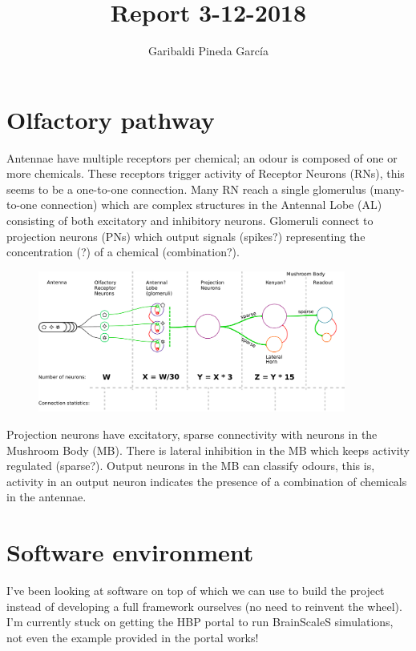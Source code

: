 \documentclass[11pt,a4paper]{article}
\author{Garibaldi Pineda Garc{\'i}a}
\title{Report 3-12-2018}
\begin{document}
\maketitle

\section{Olfactory pathway}

Antennae have multiple receptors per chemical; an odour is composed of one or more chemicals. 
These receptors trigger activity of Receptor Neurons (RNs), this seems to be a one-to-one connection. 
Many RN reach a single glomerulus (many-to-one connection) which are complex structures in the Antennal Lobe (AL) consisting of both excitatory and inhibitory neurons. 
Glomeruli connect to projection neurons (PNs) which output signals (spikes?) representing the concentration (?) of a chemical (combination?).

    \begin{figure}[htb]
    \begin{center}
        \includegraphics[width=0.9\textwidth]{olfactory-pathway-v2}
    \end{center}
    \end{figure}

Projection neurons have excitatory, sparse connectivity with neurons in the Mushroom Body (MB). 
There is lateral inhibition in the MB which keeps activity regulated (sparse?).
Output neurons in the MB can classify odours, this is, activity in an output neuron indicates the presence of a combination of chemicals in the antennae.



\section{Software environment}
I've been looking at software on top of which we can use to build the project instead of developing a full framework ourselves (no need to reinvent the wheel).
I'm currently stuck on getting the HBP portal to run BrainScaleS simulations, not even the example provided in the portal works!
\end{document}
